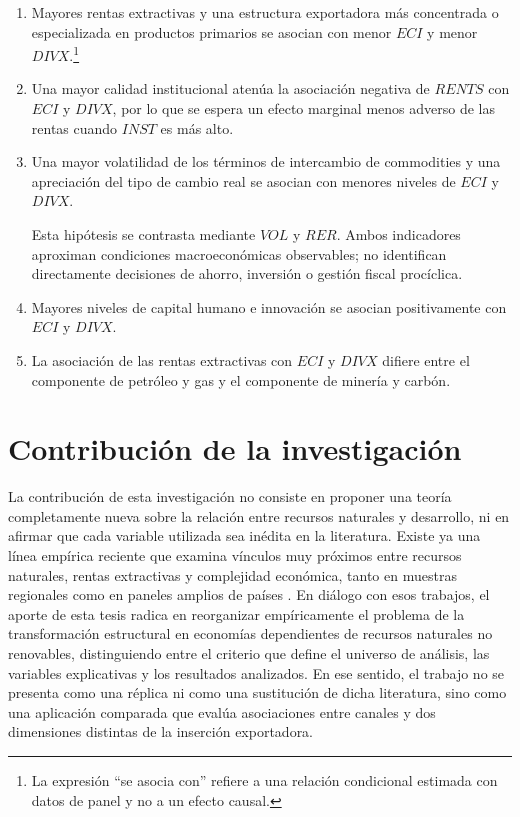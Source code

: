 \documentclass[../../TFM.tex]{subfiles}
\begin{document}
	\begin{enumerate}
		\item \label{hyp:h1} Mayores rentas extractivas y una estructura exportadora
		más concentrada o especializada en productos primarios se asocian con menor
		$ECI$ y menor $DIVX$.\footnote{La expresión ``se asocia con'' refiere a una
		relación condicional estimada con datos de panel y no a un efecto causal.}

		\item \label{hyp:h2} Una mayor calidad institucional atenúa la asociación
		negativa de $RENTS$ con $ECI$ y $DIVX$, por lo que se espera un efecto
		marginal menos adverso de las rentas cuando $INST$ es más alto.

		\item \label{hyp:h3} Una mayor volatilidad de los términos de intercambio de
		commodities y una apreciación del tipo de cambio real se asocian con menores
		niveles de $ECI$ y $DIVX$.

		Esta hipótesis se contrasta mediante $VOL$ y $RER$. Ambos indicadores aproximan
		condiciones macroeconómicas observables; no identifican directamente decisiones
		de ahorro, inversión o gestión fiscal procíclica.

		\item \label{hyp:h4} Mayores niveles de capital humano e innovación se
		asocian positivamente con $ECI$ y $DIVX$.

		\item \label{hyp:h5} La asociación de las rentas extractivas con $ECI$ y
		$DIVX$ difiere entre el componente de petróleo y gas y el componente de
		minería y carbón.
	\end{enumerate}


	\section{Contribución de la investigación}
	\label{sec:contribucion}

	La contribución de esta investigación no consiste en proponer una teoría completamente nueva sobre la relación entre recursos naturales y desarrollo, ni en afirmar que cada variable utilizada sea inédita en la literatura. Existe ya una línea empírica reciente que examina vínculos muy próximos entre recursos naturales, rentas extractivas y complejidad económica, tanto en muestras regionales como en paneles amplios de países \parencite{Ajide2022,Avom2022,Canh2020,Owjimehr2024,Zhang2023}. En diálogo con esos trabajos, el aporte de esta tesis radica en reorganizar empíricamente el problema de la transformación estructural en economías dependientes de recursos naturales no renovables, distinguiendo entre el criterio que define el universo de análisis, las variables explicativas y los resultados analizados. En ese sentido, el trabajo no se presenta como una réplica ni como una sustitución de dicha literatura, sino como una aplicación comparada que evalúa asociaciones entre canales y dos dimensiones distintas de la inserción exportadora.
\end{document}
